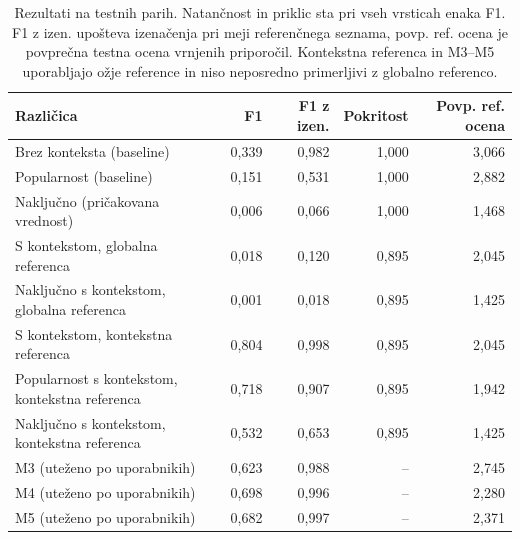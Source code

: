 \begin{table}[htbp]
\centering
\caption{Rezultati na testnih parih. Natančnost in priklic sta pri vseh vrsticah enaka F1. F1 z izen. upošteva izenačenja pri meji referenčnega seznama, povp. ref. ocena je povprečna testna ocena vrnjenih priporočil. Kontekstna referenca in M3--M5 uporabljajo ožje reference in niso neposredno primerljivi z globalno referenco.}
\label{tab:results_all_layers}
\footnotesize
\begin{tabular}{lrrrr}
\toprule
Različica & F1 & F1 z izen. & Pokritost & Povp. ref. ocena \\
\midrule
Brez konteksta (baseline) & 0,339 & 0,982 & 1,000 & 3,066 \\
Popularnost (baseline) & 0,151 & 0,531 & 1,000 & 2,882 \\
Naključno (pričakovana vrednost) & 0,006 & 0,066 & 1,000 & 1,468 \\
S kontekstom, globalna referenca & 0,018 & 0,120 & 0,895 & 2,045 \\
Naključno s kontekstom, globalna referenca & 0,001 & 0,018 & 0,895 & 1,425 \\
S kontekstom, kontekstna referenca & 0,804 & 0,998 & 0,895 & 2,045 \\
Popularnost s kontekstom, kontekstna referenca & 0,718 & 0,907 & 0,895 & 1,942 \\
Naključno s kontekstom, kontekstna referenca & 0,532 & 0,653 & 0,895 & 1,425 \\
M3 (uteženo po uporabnikih) & 0,623 & 0,988 & -- & 2,745 \\
M4 (uteženo po uporabnikih) & 0,698 & 0,996 & -- & 2,280 \\
M5 (uteženo po uporabnikih) & 0,682 & 0,997 & -- & 2,371 \\
\bottomrule
\end{tabular}

\end{table}
